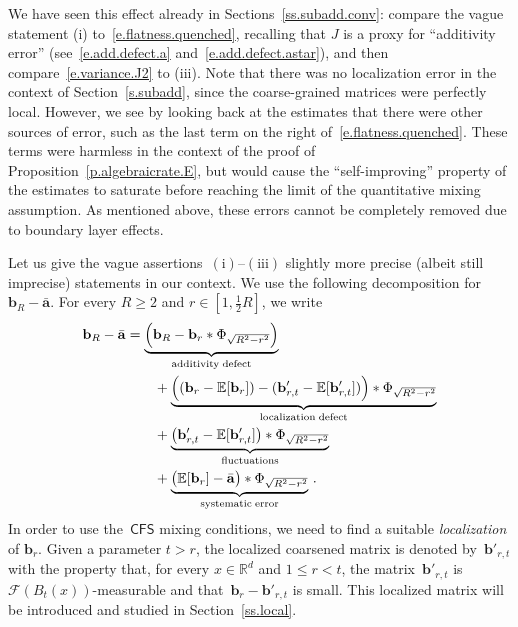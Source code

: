 \documentclass[11pt]{article} %
\numberwithin{equation}{section}
\theoremstyle{definition}
\newcommand*{\R}{\ensuremath{\mathbb{R}}}
\renewcommand{\b}{\ensuremath{\mathbf{b}}}
\renewcommand{\a}{\mathbf{a}}
\newcommand{\ahom}{\bar{\a}}
\newcommand{\F}{\mathcal{F}}
\newcommand{\E}{\mathbb{E}}
\newcommand{\CFS}{\mathsf{CFS}}
\begin{document}
\smallskip

We have seen this effect already in Sections~\ref{ss.subadd.conv}: compare the vague statement (i) to~\eqref{e.flatness.quenched}, recalling that $J$ is a proxy for ``additivity error'' (see~\eqref{e.add.defect.a} and~\eqref{e.add.defect.astar}), and then compare~\eqref{e.variance.J2} to (iii). Note that there was no localization error in the context of Section~\ref{s.subadd}, since the coarse-grained matrices were perfectly local. 
However, we see by looking back at the estimates that there were other sources of error, such as the last term on the right of~\eqref{e.flatness.quenched}. These terms were harmless in the context of the proof of Proposition~\ref{p.algebraicrate.E}, but would cause the ``self-improving'' property of the estimates to saturate before reaching the limit of the quantitative mixing assumption. As mentioned above, these errors cannot be completely removed due to boundary layer effects.

\smallskip

Let us give the vague assertions~$\mathrm{(i)}$--$\mathrm{(iii)}$ slightly more precise (albeit still imprecise) statements in our context. 
We use the following decomposition for~$\b_R - \ahom$. For every $R\geq 2$ and $r \in [1, \frac12 R]$, we write   
\begin{align} \label{e.ahomr.splitting}
\notag
\b_R - \ahom
&
=
\underbrace{
\Bigl( \b_R - \b_r \ast \Phi_{\sqrt{R^2-r^2}} \Bigr) 
}_{\mathrm{additivity \; defect}}
\\ \notag  & \qquad
+
\underbrace{
\Bigl( (\b_r - \E [ \b_r ]) - (\b'_{r,t} - \E [ \b'_{r,t} ] )  \Bigr) \ast \Phi_{\sqrt{R^2-r^2}} 
}_{\mathrm{localization \; defect}}
\\ \notag  & \qquad
+ \underbrace{
\bigl( \b'_{r,t} - \E [ \b'_{r,t} ] \bigr) \ast \Phi_{\sqrt{R^2-r^2}}
}_{\mathrm{fluctuations}}
\\ & \qquad
+
\underbrace{
\bigl( \E [ \b_r ]- \ahom \bigr) \ast \Phi_{\sqrt{R^2-r^2}}
}_{\mathrm{systematic \;  error}}
\,.
\end{align}
In order to use the~$\CFS$ mixing conditions, we need to find a suitable \emph{localization} of $\b_r$. Given a parameter $t > r$, the localized coarsened matrix is denoted by~$\b'_{r,t}$ with the property that, for every $x\in \R^d$ and $1\leq r< t$, the matrix~$\b'_{r,t}$ is $\F(B_{t}(x))$-measurable and that~$\b_r - \b'_{r,t}$ is small. This localized matrix will be introduced and studied in Section~\ref{ss.local}.
\end{document}

